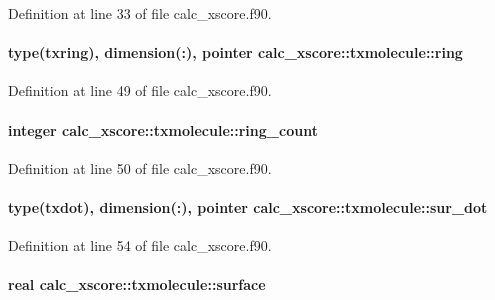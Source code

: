 Definition at line 33 of file calc\-\_\-xscore.\-f90.

\hypertarget{structcalc__xscore_1_1txmolecule_a676b618c6fa68c2b77730c195ee02a80}{
\paragraph[{ring}]{\setlength{\rightskip}{0pt plus 5cm}type({\bf txring}), dimension(\-:), pointer calc\-\_\-xscore\-::txmolecule\-::ring}}\label{structcalc__xscore_1_1txmolecule_a676b618c6fa68c2b77730c195ee02a80}


Definition at line 49 of file calc\-\_\-xscore.\-f90.

\hypertarget{structcalc__xscore_1_1txmolecule_a22b4e6360122102635dce71bd4a4ea44}{
\paragraph[{ring\-\_\-count}]{\setlength{\rightskip}{0pt plus 5cm}integer calc\-\_\-xscore\-::txmolecule\-::ring\-\_\-count}}\label{structcalc__xscore_1_1txmolecule_a22b4e6360122102635dce71bd4a4ea44}


Definition at line 50 of file calc\-\_\-xscore.\-f90.

\hypertarget{structcalc__xscore_1_1txmolecule_ae94a8a9dc958348e8601ba97b6a194bb}{
\paragraph[{sur\-\_\-dot}]{\setlength{\rightskip}{0pt plus 5cm}type({\bf txdot}), dimension(\-:), pointer calc\-\_\-xscore\-::txmolecule\-::sur\-\_\-dot}}\label{structcalc__xscore_1_1txmolecule_ae94a8a9dc958348e8601ba97b6a194bb}


Definition at line 54 of file calc\-\_\-xscore.\-f90.

\hypertarget{structcalc__xscore_1_1txmolecule_af965bf7a8cd9fb50bf4a6785a554d913}{
\paragraph[{surface}]{\setlength{\rightskip}{0pt plus 5cm}real calc\-\_\-xscore\-::txmolecule\-::surface}}\label{structcalc__xscore_1_1txmolecule_af965bf7a8cd9fb50bf4a6785a554d913}


